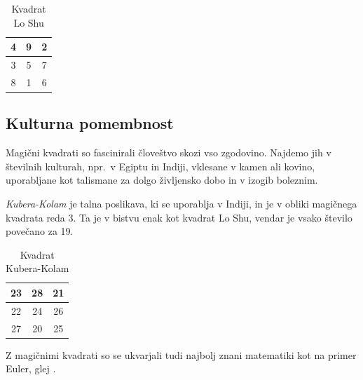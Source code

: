 \documentclass[a4paper,12pt]{article}
\newcommand{\pojem}[1]{\emph{\color{purple}#1}}
\theoremstyle{plain}
\theoremstyle{definition}
\theoremstyle{proof}
\begin{document}
\begin{table} [htp]
   \caption{Kvadrat Lo Shu}
   \centering
   \large
   
\begin{tabular}{|c|c|c|}
\hline
4 & 9 & 2 \\\hline
3 & 5 & 7 \\\hline
8 & 1 & 6 \\\hline
\end{tabular}
\label{table:loshu}
\end{table}

\subsection{Kulturna pomembnost}

Magični kvadrati so fascinirali človeštvo skozi vso zgodovino. Najdemo jih
v številnih kulturah, npr.\ v Egiptu in Indiji, vklesane v kamen ali
kovino, uporabljane kot talismane za dolgo življensko dobo in v
izogib boleznim.

\pojem{Kubera-Kolam} je talna poslikava, ki se uporablja v Indiji, in je v
obliki magičnega kvadrata reda 3. Ta je v bistvu enak kot kvadrat
Lo Shu, vendar je vsako število povečano za 19.


\begin{table} [htp]
   \caption{Kvadrat Kubera-Kolam}
   \centering
   \large
   
\begin{tabular}{|c|c|c|}
\hline
23 & 28 & 21 \\\hline
22 & 24 & 26 \\\hline
27 & 20 & 25 \\\hline
\end{tabular}
\label{table:kubera}
\end{table}

Z magičnimi kvadrati so se ukvarjali tudi najbolj znani matematiki kot na
primer Euler, glej \cite{euler}. %

\end{document}
